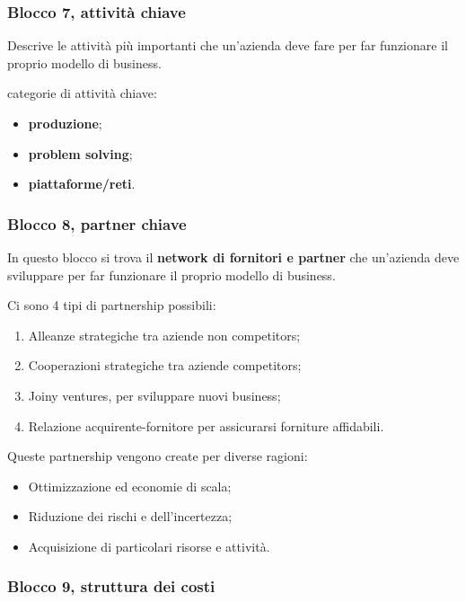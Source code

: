 \documentclass[14pt]{extarticle}
\begin{document}
\subsubsection{Blocco 7, attività chiave}

Descrive le attività più importanti che un'azienda deve fare per far funzionare
il proprio modello di business.

categorie di attività chiave:

\begin{itemize}
    \item \textbf{produzione};
    \item \textbf{problem solving};
    \item \textbf{piattaforme/reti}.
\end{itemize}

\subsubsection{Blocco 8, partner chiave}

In questo blocco si trova il \textbf{network di fornitori e partner} che
un'azienda deve sviluppare per far funzionare il proprio modello di business.

Ci sono 4 tipi di partnership possibili:

\begin{enumerate}
    \item Alleanze strategiche tra aziende non competitors;
    \item Cooperazioni strategiche tra aziende competitors;
    \item Joiny ventures, per sviluppare nuovi business;
    \item Relazione acquirente-fornitore per assicurarsi forniture affidabili.   
\end{enumerate}

Queste partnership vengono create per diverse ragioni:

\begin{itemize}
    \item Ottimizzazione ed economie di scala;
    \item Riduzione dei rischi e dell'incertezza;
    \item Acquisizione di particolari risorse e attività.
\end{itemize}

\subsubsection{Blocco 9, struttura dei costi}
\end{document}
